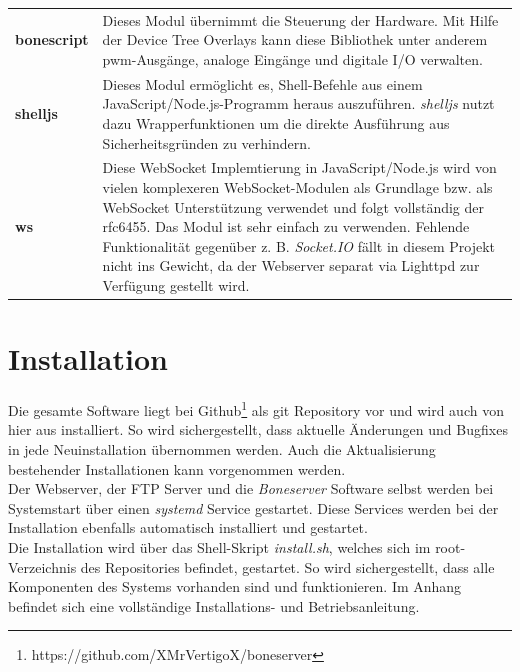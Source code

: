 \documentclass[thesis.tex]{subfiles}
\begin{document}
\begin{longtabu} to \textwidth {
X[1]
X[5]}
\textbf{bonescript} & Dieses Modul übernimmt die Steuerung der Hardware. Mit Hilfe der Device Tree Overlays kann diese Bibliothek unter anderem \gls{pwm}-Ausgänge, analoge Eingänge und digitale I/O verwalten.\\
\textbf{shelljs} & Dieses Modul ermöglicht es, Shell-Befehle aus einem JavaScript/Node.js-Programm heraus auszuführen. \textit{shelljs} nutzt dazu Wrapperfunktionen um die direkte Ausführung aus Sicherheitsgründen zu verhindern.\\
\textbf{ws} & Diese WebSocket Implemtierung in JavaScript/Node.js wird von vielen komplexeren WebSocket-Modulen als Grundlage bzw. als WebSocket Unterstützung verwendet und folgt vollständig der rfc6455. Das Modul ist sehr einfach zu verwenden. Fehlende Funktionalität gegenüber z. B. \emph{Socket.IO} fällt in diesem Projekt nicht ins Gewicht, da der Webserver separat via Lighttpd zur Verfügung gestellt wird.
\end{longtabu}


\section{Installation}
Die gesamte Software liegt bei Github\footnote{https://github.com/XMrVertigoX/boneserver} als git Repository vor und wird auch von hier aus installiert. So wird sichergestellt, dass aktuelle Änderungen und Bugfixes in jede Neuinstallation übernommen werden. Auch die Aktualisierung bestehender Installationen kann vorgenommen werden.\\ 
Der Webserver, der FTP Server und die \textit{Boneserver} Software selbst werden bei Systemstart über einen \textit{systemd} Service gestartet. Diese Services werden bei der Installation ebenfalls automatisch installiert und gestartet.\\

Die Installation wird über das Shell-Skript \textit{install.sh}, welches sich im root-Verzeichnis des Repositories befindet, gestartet. So wird sichergestellt, dass alle Komponenten des Systems vorhanden sind und funktionieren. Im Anhang befindet sich eine vollständige Installations- und Betriebsanleitung.
\end{document}
